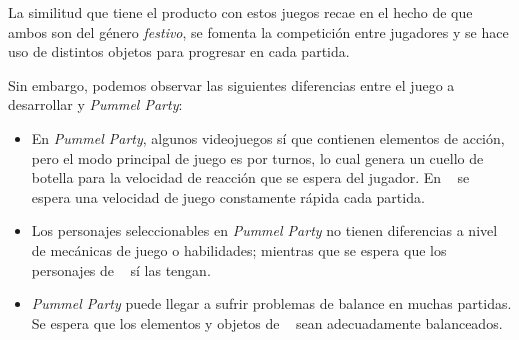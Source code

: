 La similitud que tiene el producto con estos juegos recae en el hecho de que
ambos son del género \emph{festivo}, se fomenta la competición entre jugadores y
se hace uso de distintos objetos para progresar en cada partida.

Sin embargo, podemos observar las siguientes diferencias entre el juego a
desarrollar y \emph{Pummel Party}:

\begin{itemize}
    \item En \emph{Pummel Party}, algunos videojuegos sí que contienen elementos
    de acción, pero el modo principal de juego es por turnos, lo cual genera un
    cuello de botella para la velocidad de reacción que se espera del jugador.
    En \emph{\izenburua\ } se espera una velocidad de juego constamente rápida
    cada partida.

    \item Los personajes seleccionables en \emph{Pummel Party} no
    tienen diferencias a nivel de mecánicas de juego o habilidades; mientras que
    se espera que los personajes de \emph{\izenburua\ } sí las tengan.

    \item \emph{Pummel Party} puede llegar a sufrir problemas de balance en
    muchas partidas. Se espera que los elementos y objetos de \emph{\izenburua\
    } sean adecuadamente balanceados.
\end{itemize}

